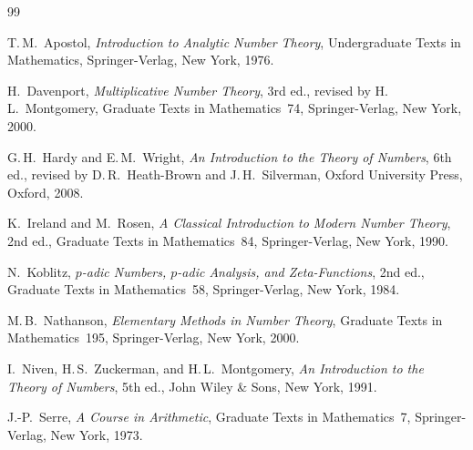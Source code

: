 \documentclass[12pt,a4paper,openany]{book}
\theoremstyle{definition}
\theoremstyle{plain}
\theoremstyle{remark}
\begin{document}
\begin{thebibliography}{99}
\label{sec:bibliography}

T.\,M.\ Apostol,
\emph{Introduction to Analytic Number Theory},
Undergraduate Texts in Mathematics,
Springer-Verlag, New York, 1976.

H.\ Davenport,
\emph{Multiplicative Number Theory},
3rd ed., revised by H.\,L.\ Montgomery,
Graduate Texts in Mathematics~74,
Springer-Verlag, New York, 2000.

G.\,H.\ Hardy and E.\,M.\ Wright,
\emph{An Introduction to the Theory of Numbers},
6th ed., revised by D.\,R.\ Heath-Brown and J.\,H.\ Silverman,
Oxford University Press, Oxford, 2008.

K.\ Ireland and M.\ Rosen,
\emph{A Classical Introduction to Modern Number Theory},
2nd ed., Graduate Texts in Mathematics~84,
Springer-Verlag, New York, 1990.

N.\ Koblitz,
\emph{$p$-adic Numbers, $p$-adic Analysis, and Zeta-Functions},
2nd ed., Graduate Texts in Mathematics~58,
Springer-Verlag, New York, 1984.

M.\,B.\ Nathanson,
\emph{Elementary Methods in Number Theory},
Graduate Texts in Mathematics~195,
Springer-Verlag, New York, 2000.

I.\ Niven, H.\,S.\ Zuckerman, and H.\,L.\ Montgomery,
\emph{An Introduction to the Theory of Numbers},
5th ed., John Wiley \& Sons, New York, 1991.

J.-P.\ Serre,
\emph{A Course in Arithmetic},
Graduate Texts in Mathematics~7,
Springer-Verlag, New York, 1973.

\end{thebibliography}

\printindex
\end{document}
